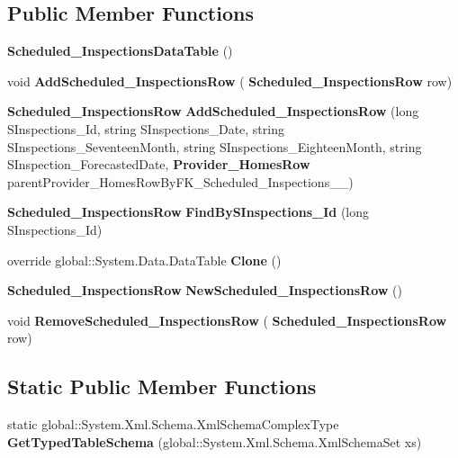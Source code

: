 \subsection*{Public Member Functions}
\begin{DoxyCompactItemize}
\item 
\textbf{ Scheduled\+\_\+\+Inspections\+Data\+Table} ()
\item 
void \textbf{ Add\+Scheduled\+\_\+\+Inspections\+Row} (\textbf{ Scheduled\+\_\+\+Inspections\+Row} row)
\item 
\textbf{ Scheduled\+\_\+\+Inspections\+Row} \textbf{ Add\+Scheduled\+\_\+\+Inspections\+Row} (long S\+Inspections\+\_\+\+Id, string S\+Inspections\+\_\+\+Date, string S\+Inspections\+\_\+\+Seventeen\+Month, string S\+Inspections\+\_\+\+Eighteen\+Month, string S\+Inspection\+\_\+\+Forecasted\+Date, \textbf{ Provider\+\_\+\+Homes\+Row} parent\+Provider\+\_\+\+Homes\+Row\+By\+F\+K\+\_\+\+Scheduled\+\_\+\+Inspections\+\_\+\_)
\item 
\textbf{ Scheduled\+\_\+\+Inspections\+Row} \textbf{ Find\+By\+S\+Inspections\+\_\+\+Id} (long S\+Inspections\+\_\+\+Id)
\item 
override global\+::\+System.\+Data.\+Data\+Table \textbf{ Clone} ()
\item 
\textbf{ Scheduled\+\_\+\+Inspections\+Row} \textbf{ New\+Scheduled\+\_\+\+Inspections\+Row} ()
\item 
void \textbf{ Remove\+Scheduled\+\_\+\+Inspections\+Row} (\textbf{ Scheduled\+\_\+\+Inspections\+Row} row)
\end{DoxyCompactItemize}
\subsection*{Static Public Member Functions}
\begin{DoxyCompactItemize}
\item 
static global\+::\+System.\+Xml.\+Schema.\+Xml\+Schema\+Complex\+Type \textbf{ Get\+Typed\+Table\+Schema} (global\+::\+System.\+Xml.\+Schema.\+Xml\+Schema\+Set xs)
\end{DoxyCompactItemize}
